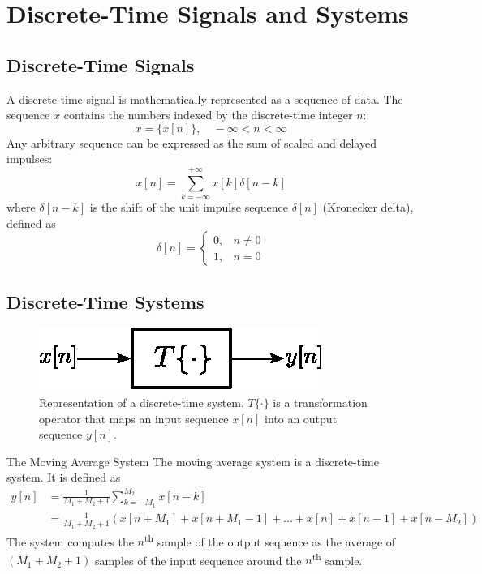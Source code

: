 \section{Discrete-Time Signals and Systems}
\subsection{Discrete-Time Signals}
A discrete-time signal is mathematically represented
as a sequence of data. The
sequence $x$ contains the numbers indexed by
the discrete-time integer $n$:
\[
    x = \{ x[n] \}, \quad -\infty < n < \infty
\]
Any arbitrary sequence can be expressed as the sum of scaled and delayed impulses:
\[
    x[n] = \sum_{k=-\infty}^{+\infty} x[k] \delta[n-k]
\]
where $\delta[n-k]$ is the shift of the unit impulse sequence $\delta[n]$ (Kronecker delta), defined as
\[
    \delta[n] = 
    \begin{cases}
        0,  & n \neq 0 \\
        1,  & n = 0
    \end{cases}
\]

\subsection{Discrete-Time Systems}
\begin{figure}[H]
    \centering
    \includegraphics[width=.4\textwidth]{images/discrete-time-system.eps}
    \caption{Representation of a discrete-time system. $T\{\cdot\}$ is a transformation operator that maps an input sequence $x[n]$ into an output sequence $y[n]$.}
    \label{fig:dt_sys}
\end{figure}

\begin{ex}{The Moving Average System}
The moving average system is a discrete-time system. It is defined as
\begin{align*}
    y[n] 
    & = \frac{1}{M_1 + M_2 + 1} \sum_{k=-M_1}^{M_2} x[n-k] \\
    & = \frac{1}{M_1 + M_2 + 1} (x[n+M_1] + x[n+M_1 -1] + ... + x[n] + x[n-1] + x[n-M_2])
\end{align*}
The system computes the $n$\textsuperscript{th} sample of the output sequence as the average of $(M_1+M_2+1)$ samples of the input sequence around the $n$\textsuperscript{th} sample.
\end{ex}
